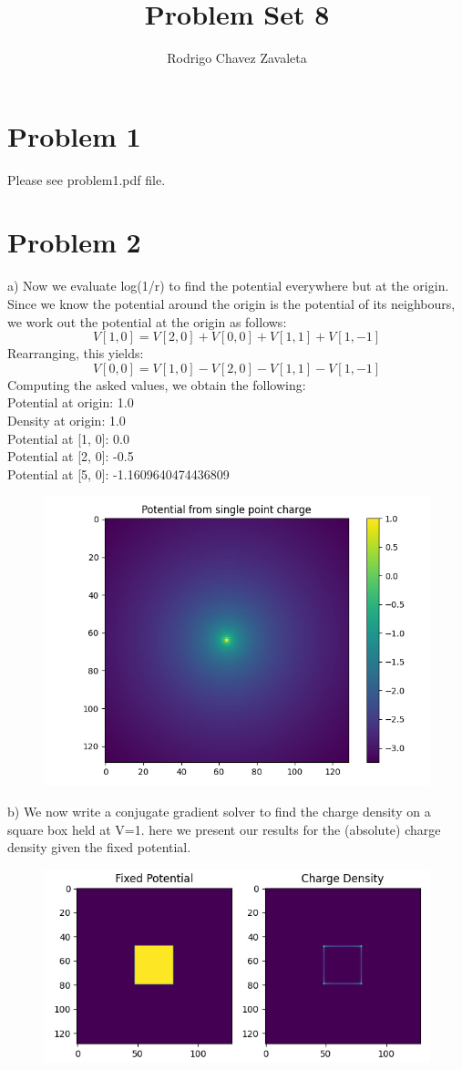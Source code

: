 \documentclass[]{article}
\title{Problem Set 8}
\author{Rodrigo Chavez Zavaleta}
\begin{document}
\maketitle

\section{Problem 1}
Please see problem1.pdf file.

\section{Problem 2}

a) Now we evaluate log(1/r) to find the potential everywhere but at the origin. Since we know the potential around the origin is the potential of its neighbours, we work out the potential at the origin as follows:
$$
	V[1,0] = V[2,0] + V[0,0] + V[1,1] + V[1,-1]
$$
Rearranging, this yields:
$$
	V[0,0] = V[1,0] - V[2,0] - V[1,1] - V[1,-1]
$$
Computing the asked values, we obtain the following:
\\
Potential at origin: 1.0\\
Density at origin: 1.0\\
Potential at [1, 0]: 0.0\\
Potential at [2, 0]: -0.5\\
Potential at [5, 0]: -1.1609640474436809\\

\begin{figure}[h!]
	\centering
	\includegraphics[width=0.5\linewidth]{../Results/2a1.png}
\end{figure}

\newpage
b) We now write a conjugate gradient solver to find the charge density on a square box held at V=1. here we present our results for the (absolute) charge density given the fixed potential.

\begin{figure}[h!]
	\centering
	\includegraphics[width=0.75\linewidth]{../Results/2b1.png}
\end{figure}
\end{document}
